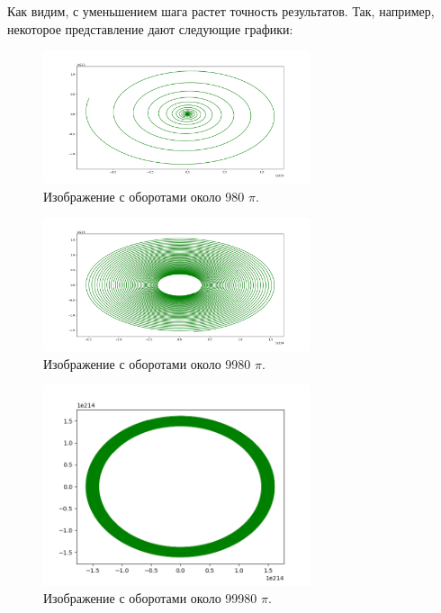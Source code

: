 \documentclass[a4paper,12pt]{article}
\begin{document}
  \FloatBarrier
  Как видим, с уменьшением шага растет точность результатов. Так, например, некоторое представление дают следующие графики:

\begin{figure}[H]
      \centering
      \includegraphics[width=0.7\textwidth]{DEF_5_1.png}
      \caption{Изображение с оборотами около 980 $\pi$.}
      
\end{figure}
\begin{figure}
\centering
      \includegraphics[width=0.7\textwidth]{DEF_5_2.png}
      \caption{Изображение с оборотами около 9980 $\pi$.}
\end{figure}
\begin{figure}
\centering
      \includegraphics[width=0.7\textwidth]{DEF_5_3.png}
      \caption{Изображение с оборотами около 99980 $\pi$.}
  \end{figure}
  \FloatBarrier
\end{document}
